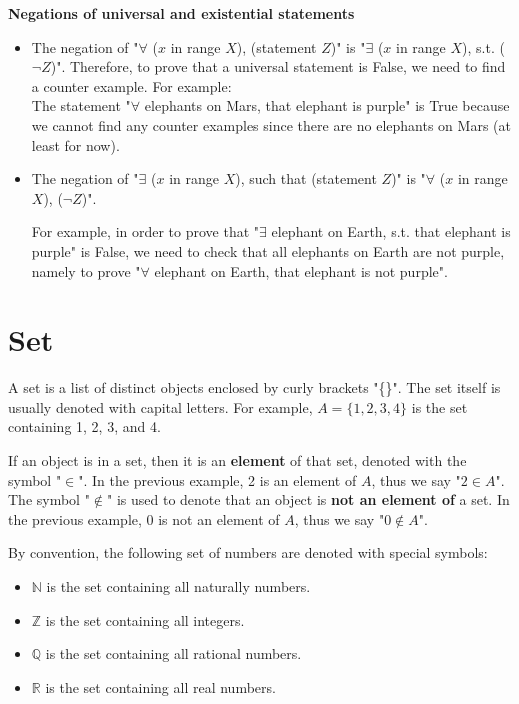 \documentclass[main.tex]{subfiles}
\begin{document}
\begin{remark} \textbf{Negations of universal and existential statements}\\
    \begin{itemize}
        \item The negation of "$\forall$ ($x$ in range $X$), (statement $Z$)" is "$\exists$ ($x$ in range $X$), s.t. ($\neg Z$)". Therefore, to prove that a universal statement is False, we need to find a counter example. For example:\\
        
        The statement "$\forall$ elephants on Mars, that elephant is purple" is True because we cannot find any counter examples since there are no elephants on Mars (at least for now).
        
        \item The negation of "$\exists$ ($x$ in range $X$), such that (statement $Z$)" is "$\forall$ ($x$ in range $X$), ($\neg Z$)".

        For example, in order to prove that "$\exists$ elephant on Earth, s.t. that elephant is purple" is False, we need to check that all elephants on Earth are not purple, namely to prove "$\forall$ elephant on Earth, that elephant is not purple".
    \end{itemize}
    
\end{remark}



\section{Set}
A set is a list of distinct objects enclosed by curly brackets "\{\}". The set itself is usually denoted with capital letters. For example, $A=\{1, 2, 3, 4\}$ is the set containing 1, 2, 3, and 4. 

\begin{definition}
    If an object is in a set, then it is an \textbf{element} of that set, denoted with the symbol "$\in$". In the previous example, 2 is an element of $A$, thus we say "$2\in A$". The symbol "$\notin$" is used to denote that an object is \textbf{not an element of} a set. In the previous example, 0 is not an element of $A$, thus we say "$0\notin A$".
\end{definition}

\begin{remark}
    By convention, the following set of numbers are denoted with special symbols:
    \begin{itemize}
        \item $\mathbb{N}$ is the set containing all naturally numbers.
        \item $\mathbb{Z}$ is the set containing all integers.
        \item $\mathbb{Q}$ is the set containing all rational numbers.
        \item $\mathbb{R}$ is the set containing all real numbers.
    \end{itemize}
\end{remark}
\end{document}
